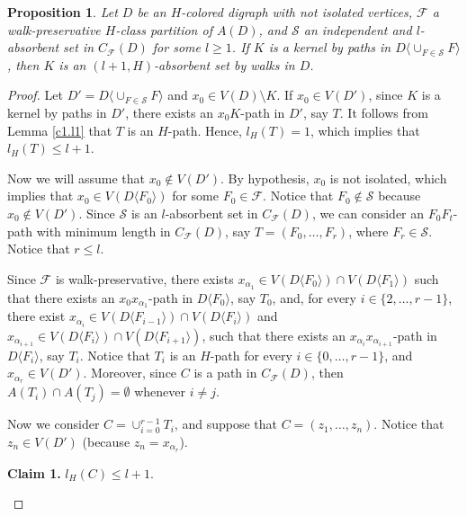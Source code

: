 \documentclass[10pt,a4paper]{article}
\newtheorem{prop}[theorem]{Proposition}
\begin{document}
\begin{prop}
\label{c1.p2}
Let $D$ be an $H$-colored digraph with not isolated vertices, $\mathscr{F}$ a walk-preservative $H$-class partition of $A(D)$, and $\mathcal{S}$ an independent and $l$-absorbent set in $C_{\mathscr{F}}(D)$ for some $l \geq 1$. If $K$ is a kernel by paths in $D\langle \cup_{F\in \mathcal{S}}F \rangle$, then $K$ is an $(l+1, H)$-absorbent set by walks in $D$.
\end{prop}
\begin{proof}
Let $D'=D\langle \cup_{F\in \mathcal{S}}F \rangle$ and $x_{0} \in V(D) \setminus K$. If $x_{0} \in V(D')$, since $K$ is a kernel by paths in $D'$, there exists an $x_{0}K$-path in $D'$, say $T$. It follows from Lemma \ref{c1.l1} that $T$ is an $H$-path. Hence, $l_{H}(T)=1$, which implies that $l_{H}(T)\leq l+1$. 

Now we will assume that $x_{0} \notin V(D')$. By hypothesis, $x_{0}$ is not isolated, which implies that $x_{0} \in V(D\langle F_{0} \rangle)$ for some $F_{0} \in \mathscr{F}$. Notice that $F_{0} \notin \mathcal{S}$ because $x_{0} \notin V(D')$. Since $\mathcal{S}$ is an $l$-absorbent set in $C_{\mathscr{F}}(D)$, we can consider an $F_{0}F_{t}$-path with minimum length in $C_{\mathscr{F}}(D)$, say $T=(F_{0}, \ldots , F_{r})$, where $F_{r} \in \mathcal{S}$. Notice that $r \leq l$.

Since $\mathscr{F}$ is walk-preservative, there exists $x_{\alpha_{1}} \in V(D\langle F_{0} \rangle ) \cap V(D\langle F_{1} \rangle)$ such that there exists an $x_{0}x_{\alpha_{1}}$-path in $D\langle F_{0} \rangle$, say $T_{0}$,
and, for every $i \in \{2, \ldots , r-1 \}$, there exist $x_{\alpha_{i}} \in V(D\langle F_{i-1} \rangle ) \cap V(D\langle F_{i} \rangle)$ and $x_{\alpha_{i+1}} \in V(D\langle F_{i} \rangle)\cap V(D\langle F_{i+1} \rangle )$, such that there exists an $x_{\alpha_{i}}x_{\alpha_{i+1}}$-path in $D\langle F_{i} \rangle$, say $T_{i}$. 
Notice that $T_{i}$ is an $H$-path for every $i \in \{ 0, \ldots , r-1 \}$, and $x_{\alpha _{r}} \in V(D')$. Moreover, since $C$ is a path in $C_{\mathscr{F}}(D)$, then $A(T_{i}) \cap A(T_{j}) = \emptyset$ whenever $i \neq j$.

Now we consider  $C=\cup_{i=0}^{r-1} T_{i}$, and suppose that $C=(z_{1}, \ldots , z_{n})$. Notice that $z_{n} \in V(D ' )$ (because $z_{n}=x_{\alpha_{r}}$). 

\begin{description}
\item \textbf{Claim 1.} $l_{H}(C) \leq l+1$.


\end{description}
\end{proof}
\end{document}
